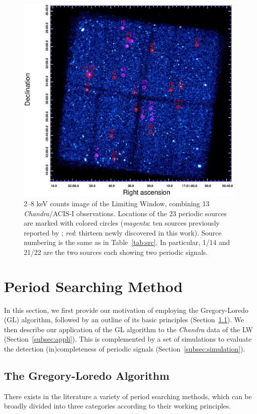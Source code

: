 \documentclass[fleqn,usenatbib]{mnras}
\begin{document}
\begin{figure}
\centering
\includegraphics[scale=0.8]{./figure/LW/ds9.eps}
\caption{2--8 keV counts image of the Limiting Window, combining 13 {\it Chandra}/ACIS-I observations. Locations of the 23 periodic sources are marked with colored circles ({\it magenta}: ten sources previously reported by \citealp{2012ApJ...746..165H}; {\it red}: thirteen newly discovered in this work). Source numbering is the same as in Table~\ref{tab:src}. In particular, 1/14 and 21/22 are the two sources each showing two periodic signals.}
\label{fig:FoV}
\end{figure}

\section{Period Searching Method}\label{sec:methods}
In this section, we first provide our motivation of employing the Gregory-Loredo (GL) algorithm, followed by an outline of its basic principles (Section~\ref{subsec:GL}). We then describe our application of the GL algorithm to the {\it Chandra} data of the LW (Section~\ref{subsec:appli}). This is complemented by a set of simulations to evaluate the detection (in)completeness of periodic signals (Section~\ref{subsec:simulation}).  

\subsection{The Gregory-Loredo Algorithm} \label{subsec:GL}
There exists in the literature a variety of period searching methods, which can be broadly divided into three categories according to their working principles. 
\end{document}
